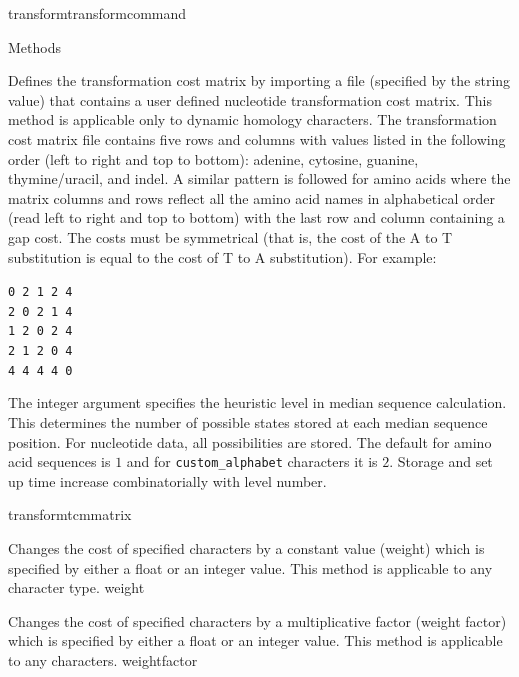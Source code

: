\begin{command}{transform}{transformcommand}
\begin{arguments}
\begin{argumentgroup}{Methods}
            {Defines the transformation cost matrix by importing a file (specified by
            the string value) that contains a user defined nucleotide
            transformation cost matrix. This method is applicable only to dynamic homology characters.
            The transformation cost matrix file contains five rows and columns
            with values listed in the following order (left to right and top to
            bottom): adenine, cytosine, guanine,
            thymine/uracil, and indel.  A similar pattern is followed for amino acids
            where the matrix columns and rows reflect all the amino acid names in alphabetical order
            (read left to right and top to bottom) with the last row and column containing a gap cost. 
            The costs must be symmetrical (that is, the
            cost of the A to T substitution is equal to the cost of T to A
            substitution). For example:
	        \begin{center}
            \texttt{0 2 1 2 4 \\
            2 0 2 1 4 \\
            1 2 0 2 4 \\
            2 1 2 0 4 \\
            4 4 4 4 0} 
            \end{center}
            The integer argument specifies the heuristic level in median sequence calculation.  
            This determines the number of possible states stored at each median sequence position.  
            For nucleotide data, all possibilities are stored.  The default for amino acid sequences is $1$
            and for \texttt{custom\_alphabet} characters it is $2$.  Storage and set up time increase combinatorially with
            level number.}
            {transformtcmmatrix}

            {Changes the cost of specified characters by a
            constant value (weight) which is specified by either a
            float or an integer value. This method is applicable to any character type.} 
            {weight}

            {Changes the cost of specified characters by a
            multiplicative factor (weight factor) which is specified by either a
            float or an integer value. This method is applicable to any characters.} 
            {weightfactor}


\end{argumentgroup}
\end{arguments}
\end{command}
